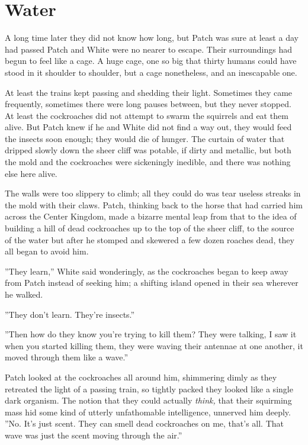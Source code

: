\documentclass[12pt]{book}
\begin{document}
\section{Water}

 A long time later %
 they did not know how long, but Patch was sure at least a day had passed %
 Patch and White were no nearer to escape. Their surroundings had begun to feel like a cage. A huge cage, one so big that thirty humans could have stood in it shoulder to shoulder, but a cage nonetheless, and an inescapable one.\par
 At least the trains kept passing and shedding their light. Sometimes they came frequently, sometimes there were long pauses between, but they never stopped. At least the cockroaches did not attempt to swarm the squirrels and eat them alive. But Patch knew if he and White did not find a way out, they would feed the insects soon enough; they would die of hunger. The curtain of water that dripped slowly down the sheer cliff was potable, if dirty and metallic, but both the mold and the cockroaches were sickeningly inedible, and there was nothing else here alive.\par
 The walls were too slippery to climb; all they could do was tear useless streaks in the mold with their claws. Patch, thinking back to the horse that had carried him across the Center Kingdom, made a bizarre mental leap from that to the idea of building a hill of dead cockroaches up to the top of the sheer cliff, to the source of the water %
 but after he stomped and skewered a few dozen roaches dead, they all began to avoid him.\par
 ''They learn,'' White said wonderingly, as the cockroaches began to keep away from Patch instead of seeking him; a shifting island opened in their sea wherever he walked.\par
 ''They don't learn. They're insects.''\par
 ''Then how do they know you're trying to kill them? They were talking, I saw it when you started killing them, they were waving their antennae at one another, it moved through them like a wave.''\par
 Patch looked at the cockroaches all around him, shimmering dimly as they retreated the light of a passing train, so tightly packed they looked like a single dark organism. The notion that they could actually {\it think,} that their squirming mass hid some kind of utterly unfathomable intelligence, unnerved him deeply. ''No. It's just scent. They can smell dead cockroaches on me, that's all. That wave was just the scent moving through the air.''\par
\end{document}
